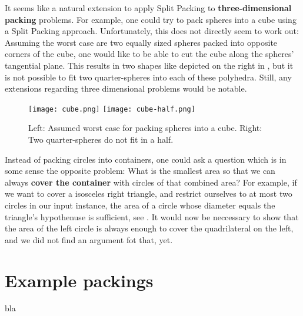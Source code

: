\documentclass[a4paper,style=print,bibliography=totoc,nexus,lnum,extramargin]{tubsbook}
\begin{document}
It seems like a natural extension to apply Split Packing to \textbf{three-dimensional packing} problems. For example, one could try to pack spheres into a cube using a Split Packing approach. Unfortunately, this does not directly seem to work out: Assuming the worst case are two equally sized spheres packed into opposite corners of the cube, one would like to be able to cut the cube along the spheres' tangential plane. This results in two shapes like depicted on the right in , but it is not possible to fit two quarter-spheres into each of these polyhedra. Still, any extensions regarding three dimensional problems would be notable.

\begin{figure}
    \texttt{[image: cube.png]}
    \texttt{[image: cube-half.png]}
    \caption{Left: Assumed worst case for packing spheres into a cube. Right: Two quarter-spheres do not fit in a half.}\label{fig:cube-half}
\end{figure}

Instead of packing circles into containers, one could ask a question which is in some sense the opposite problem: What is the smallest area so that we can always \textbf{cover the container} with circles of that combined area? For example, if we want to cover a isosceles right triangle, and restrict ourselves to at most two circles in our input instance, the area of a circle whose diameter equals the triangle's hypothenuse is sufficient, see . It would now be neccessary to show that the area of the left circle is always enough to cover the quadrilateral on the left, and we did not find an argument fot that, yet.


\appendix

\chapter{Example packings}

bla

\printbibliography
\end{document}
